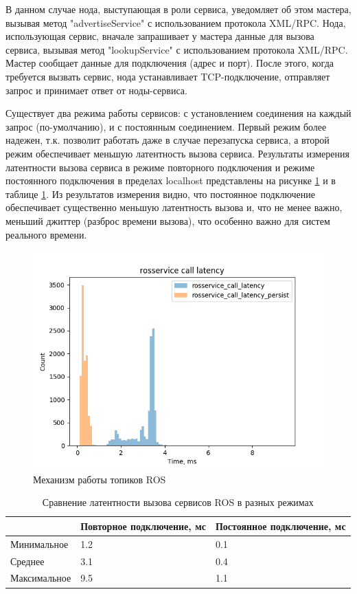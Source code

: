 В данном случае нода, выступающая в роли сервиса, уведомляет об этом мастера, вызывая метод "advertiseService" с
использованием протокола XML/RPC. Нода, использующая сервис, вначале запрашивает у мастера данные для вызова сервиса,
вызывая метод "lookupService" с использованием протокола XML/RPC. Мастер сообщает данные  для подключения (адрес и порт).
После этого, когда требуется вызвать сервис, нода устанавливает TCP-подключение, отправляет запрос и принимает ответ
от ноды-сервиса.

Существует два режима работы сервисов: с установлением соединения на каждый запрос (по-умолчанию), и с постоянным
соединением. Первый режим более надежен, т.к. позволит работать даже в случае перезапуска сервиса, а второй режим
обеспечивает меньшую латентность вызова сервиса. Результаты измерения латентности вызова сервиса в режиме повторного
подключения и режиме постоянного подключения в пределах localhost представлены на рисунке
\ref{img:rosservice_call_latency} и в таблице \ref{tab:rosservice_call_latency}. Из результатов измерения видно,
что постоянное подключение обеспечивает существенно меньшую латентность вызова и, что не менее важно, меньший
джиттер (разброс времени вызова), что особенно важно для систем реального времени.

\begin{figure}[h]
    \centering
    \includegraphics[]{images/3_devel/rosservice_call_latency}
    \caption{Механизм работы топиков ROS}
    \label{img:rosservice_call_latency}
\end{figure}

\begin{table}[h]
    \caption{Сравнение латентности вызова сервисов ROS в разных режимах}
    \label{tab:rosservice_call_latency}
    \begin{tabularx}{\textwidth}{|l|X|X|}
        \hline
                     & Повторное подключение, мс & Постоянное подключение, мс \\
        \hline
        Минимальное  & 1.2 & 0.1 \\
        \hline
        Среднее      & 3.1 & 0.4 \\
        \hline
        Максимальное & 9.5 & 1.1 \\
        \hline
    \end{tabularx}
\end{table}

